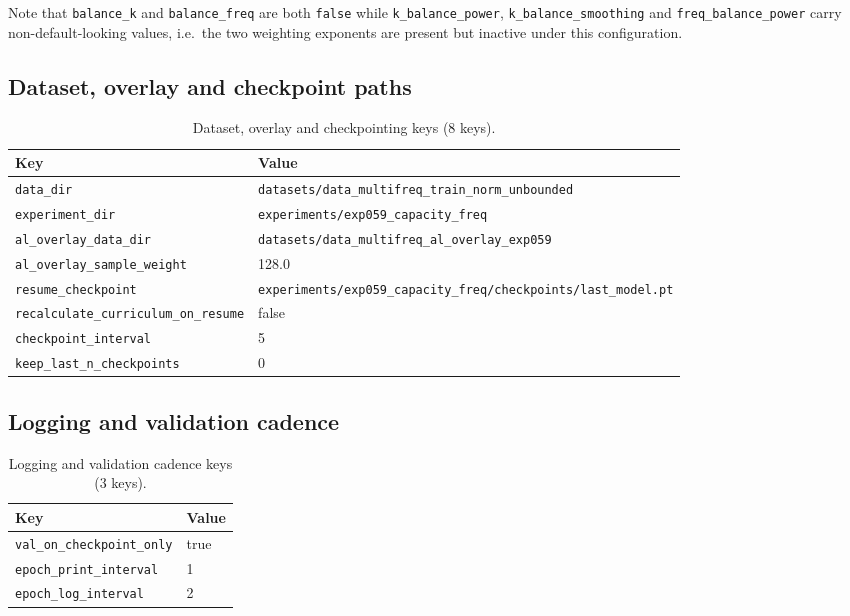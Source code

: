 Note that \texttt{balance\_k} and \texttt{balance\_freq} are both \texttt{false} while
\texttt{k\_balance\_power}, \texttt{k\_balance\_smoothing} and
\texttt{freq\_balance\_power} carry non-default-looking values, i.e.\ the two weighting
exponents are present but inactive under this configuration.

\subsection{Dataset, overlay and checkpoint paths}
\label{subsec:appb_paths}

\begin{table}[htbp]
\centering
\caption{Dataset, overlay and checkpointing keys (8 keys).}
\label{tab:appb_paths}
\begin{tabular}{@{}lp{}@{}}
\hline
Key & Value \\
\hline
\texttt{data\_dir} & \texttt{datasets/\allowbreak data\_multifreq\_\allowbreak train\_norm\_unbounded} \\
\texttt{experiment\_dir} & \texttt{experiments/\allowbreak exp059\_capacity\_freq} \\
\texttt{al\_overlay\_data\_dir} & \texttt{datasets/\allowbreak data\_multifreq\_\allowbreak al\_overlay\_exp059} \\
\texttt{al\_overlay\_sample\_weight} & 128.0 \\
\texttt{resume\_checkpoint} & \texttt{experiments/\allowbreak exp059\_capacity\_freq/\allowbreak checkpoints/\allowbreak last\_model.pt} \\
\texttt{recalculate\_curriculum\_on\_resume} & false \\
\texttt{checkpoint\_interval} & 5 \\
\texttt{keep\_last\_n\_checkpoints} & 0 \\
\hline
\end{tabular}
\end{table}

\subsection{Logging and validation cadence}
\label{subsec:appb_logging}

\begin{table}[htbp]
\centering
\caption{Logging and validation cadence keys (3 keys).}
\label{tab:appb_logging}
\begin{tabular}{@{}ll@{}}
\hline
Key & Value \\
\hline
\texttt{val\_on\_checkpoint\_only} & true \\
\texttt{epoch\_print\_interval} & 1 \\
\texttt{epoch\_log\_interval} & 2 \\
\hline
\end{tabular}
\end{table}

